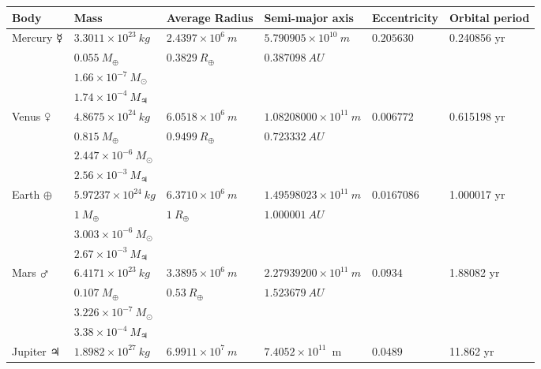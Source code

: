 \def\arraystretch{1.1}
\begin{tabular}{ |l|l|l|l|l|l| } 
\hline
\textbf{Body}		& \textbf{Mass}						& \textbf{Average Radius} 	& \textbf{Semi-major axis} 		& \textbf{Eccentricity}	& \textbf{Orbital period} \\ 
\hline
Mercury $\mercury$	& $3.3011 \times 10^{23}\ kg$		& $2.4397 \times 10^6\ m$	& $5.790905 \times 10^{10}\ m$	& $	0.205 630$			& 0.240856 yr\\
					& $0.055\ M_\oplus $				& $0.3829\ R_\oplus$		& $0.387098\ AU$				&						& 			\\
                	& $1.66 \times 10^{-7}\ M_{\odot}$ 	&							&								&						&			\\
					& $1.74\times 10^{-4}\ M_{\jupiter}$&							&								&						&			\\
\hline
Venus $\venus$		& $4.8675 \times 10^{24}\ kg$		& $6.0518 \times 10^6\ m$	& $1.08208000 \times 10^{11}\ m$	& $0.006772$		& 0.615198 yr\\
					& $0.815\ M_\oplus $				& $0.9499\ R_\oplus$		& $0.723332\ AU$					&						& 			\\
                	& $2.447 \times 10^{-6}\ M_{\odot}$ &							&								&						&			\\
                    & $2.56\times 10^{-3}\ M_{\jupiter}$&							&								&						&			\\
\hline
Earth $\oplus$	 	& $5.97237 \times 10^{24}\ kg$		& $6.3710 \times 10^6\ m$	& $1.49598023 \times 10^{11}\ m$& $0.0167086$			& 1.000017 yr\\
					& $1\ M_\oplus $					& $1\ R_\oplus$				& $1.000001\ AU$				&						&			\\
                	& $3.003 \times 10^{-6}\ M_{\odot}$ &							&								&						&			\\
                    & $2.67\times 10^{-3}\ M_{\jupiter}$&							&								&						&			\\
\hline
Mars $\mars$ 		& $6.4171 \times 10^{23}\ kg$		& $3.3895 \times 10^6\ m$	& $2.27939200 \times 10^{11}\ m$& $0.0934$				& 1.88082 yr\\
					& $0.107\ M_\oplus $				& $0.53\ R_\oplus$			& $1.523679\ AU$				&						&			\\
                	& $3.226 \times 10^{-7}\ M_{\odot}$ &							&								&						&			\\
                    & $3.38\times 10^{-4}\ M_{\jupiter}$&							&								&						&			\\
\hline
Jupiter $\jupiter$	& $1.8982 \times 10^{27}\ kg$		& $6.9911 \times 10^7\ m$	& $7.4052 \times 10^{11}$\ m	& $0.0489$				& 11.862 yr	\\

\end{tabular}
